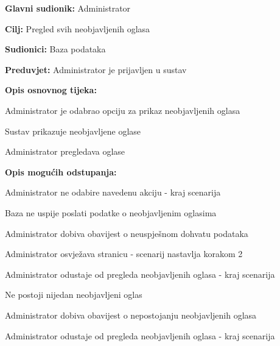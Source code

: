 					\eject

					\noindent {}
					\begin{packed_item}
	
						\item \textbf{Glavni sudionik: }Administrator
						\item  \textbf{Cilj:} Pregled svih neobjavljenih oglasa
						\item  \textbf{Sudionici:} Baza podataka
						\item  \textbf{Preduvjet:} Administrator je prijavljen u sustav
						\item  \textbf{Opis osnovnog tijeka:}
						
						\item[] \begin{packed_enum}
							\item Administrator je odabrao opciju za prikaz neobjavljenih oglasa
							\item Sustav prikazuje neobjavljene oglase
							\item Administrator pregledava oglase
						\end{packed_enum}

						\item  \textbf{Opis mogućih odstupanja:}

						\item[] \begin{packed_item}
							\item[1.a] Administrator ne odabire navedenu akciju - kraj scenarija
							\item[2.a] Baza ne uspije poslati podatke o neobjavljenim oglasima
							\item[] \begin{packed_enum}
								
								\item Administrator dobiva obavijest o neuspješnom dohvatu podataka
								\item
									\begin{packed_enum}
										\item Administrator osvježava stranicu - scenarij nastavlja korakom 2
										\item Administrator odustaje od pregleda neobjavljenih oglasa - kraj scenarija
									\end{packed_enum}
							
							\end{packed_enum}	
							\item[2.b] Ne postoji nijedan neobjavljeni oglas
							\item[] \begin{packed_enum}
								
								\item Administrator dobiva obavijest o nepostojanju neobjavljenih oglasa
								\item Administrator odustaje od pregleda neobjavljenih oglasa - kraj scenarija
							
							\end{packed_enum}
						\end{packed_item}	
					\end{packed_item}
					
